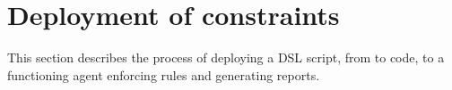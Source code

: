 \section{Deployment of constraints}

This section describes the process of deploying a DSL script, from to code, to a functioning agent enforcing rules and generating reports.







